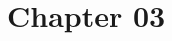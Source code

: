 \documentclass[../main]{subfiles}
\begin{document}
\setcounter{chapter}{2}

\chapter{Chapter 03}
















\end{document}
